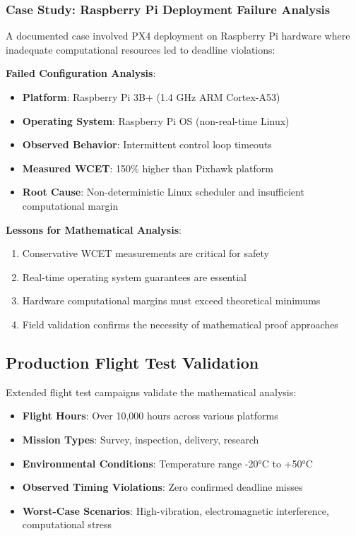 \documentclass[11pt]{article}
\begin{document}
\subsubsection{Case Study: Raspberry Pi Deployment Failure Analysis}

A documented case involved PX4 deployment on Raspberry Pi hardware where inadequate computational resources led to deadline violations:

\textbf{Failed Configuration Analysis}:
\begin{itemize}
    \item \textbf{Platform}: Raspberry Pi 3B+ (1.4 GHz ARM Cortex-A53)
    \item \textbf{Operating System}: Raspberry Pi OS (non-real-time Linux)
    \item \textbf{Observed Behavior}: Intermittent control loop timeouts
    \item \textbf{Measured WCET}: 150\% higher than Pixhawk platform
    \item \textbf{Root Cause}: Non-deterministic Linux scheduler and insufficient computational margin
\end{itemize}

\textbf{Lessons for Mathematical Analysis}:
\begin{enumerate}
    \item Conservative WCET measurements are critical for safety
    \item Real-time operating system guarantees are essential
    \item Hardware computational margins must exceed theoretical minimums
    \item Field validation confirms the necessity of mathematical proof approaches
\end{enumerate}

\subsection{Production Flight Test Validation}

Extended flight test campaigns validate the mathematical analysis:

\begin{itemize}
    \item \textbf{Flight Hours}: Over 10,000 hours across various platforms
    \item \textbf{Mission Types}: Survey, inspection, delivery, research
    \item \textbf{Environmental Conditions}: Temperature range -20°C to +50°C
    \item \textbf{Observed Timing Violations}: Zero confirmed deadline misses
    \item \textbf{Worst-Case Scenarios}: High-vibration, electromagnetic interference, computational stress
\end{itemize}
\end{document}
